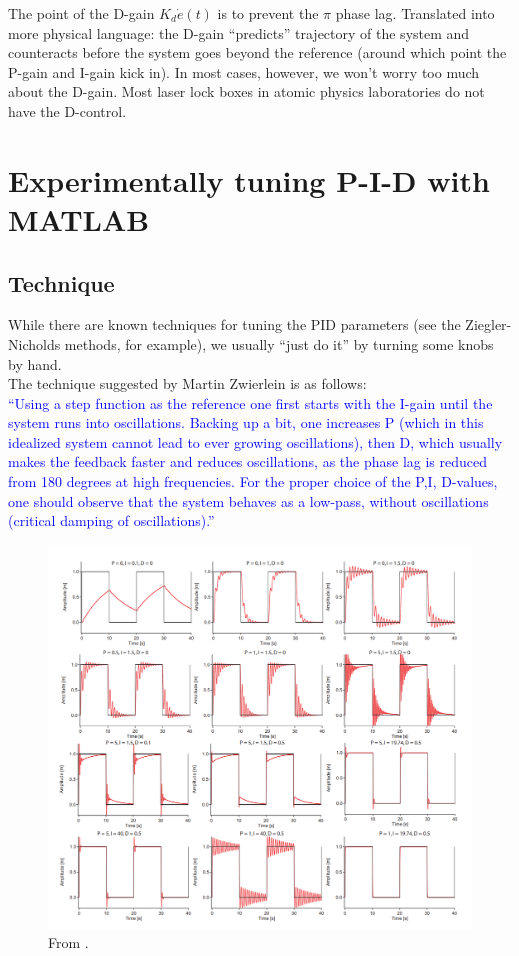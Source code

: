 \documentclass{article}
\theoremstyle{definition}
\begin{document}
The point of the D-gain $K_d \dot{e}(t)$ is to prevent the $\pi$ phase lag. Translated into more physical language: the D-gain ``predicts'' trajectory of the system and counteracts before the system goes beyond the reference (around which point the P-gain and I-gain kick in). In most cases, however, we won't worry too much about the D-gain. Most laser lock boxes in atomic physics laboratories do not have the D-control. 




\section{Experimentally tuning P-I-D with MATLAB}



\subsection{Technique}


While there are known techniques for tuning the PID parameters (see the Ziegler-Nicholds methods, for example), we usually ``just do it'' by turning some knobs by hand. \\

The technique suggested by Martin Zwierlein is as follows:\\


\noindent \textcolor{blue}{``Using a step function as the reference one first starts with the I-gain until the system runs into oscillations. Backing up a bit, one increases P (which in this idealized system cannot lead to ever growing oscillations), then D, which usually makes the feedback faster and reduces oscillations, as the phase lag is reduced from 180 degrees at high frequencies. For the proper choice of the P,I, D-values, one should observe that the system behaves as a low-pass, without oscillations (critical damping of oscillations).''}


\begin{figure}[!htb]
	\centering
	\includegraphics[width=\textwidth]{MZ_PID}
	\caption{From \cite{zwierleinPID}.}
	\label{fig:MZ_PID}
\end{figure}
\end{document}
